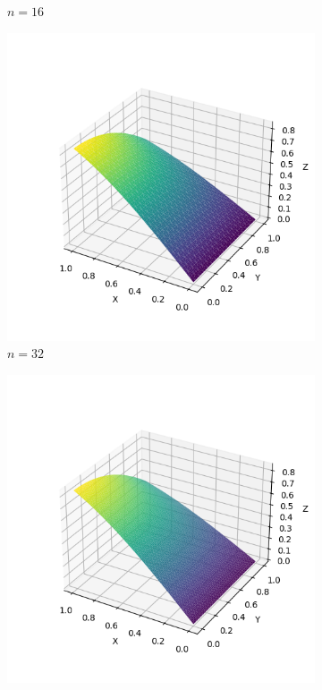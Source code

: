 \documentclass[lang=cn,a4paper,newtx,bibend=bibtex]{elegantpaper}
\begin{document}
\begin{figure}[H]
\begin{subfigure}[b]{0.18\textwidth}
      \caption{$n= 16$}
  \end{subfigure}
  \hfill
  \begin{subfigure}[b]{0.18\textwidth}
      \includegraphics[width=\textwidth]{../../res_bac/res-[data|2-Dirichlet-regular-c32].png}
      \caption{$n = 32$}
  \end{subfigure}
  \hfill
  \begin{subfigure}[b]{0.18\textwidth}
      \includegraphics[width=\textwidth]{../../res_bac/res-[data|2-Dirichlet-regular-d64].png}

\end{subfigure}
\end{figure}
\end{document}
